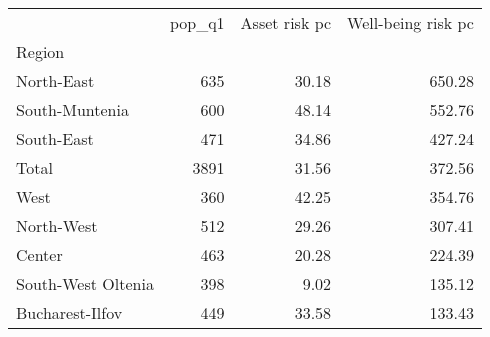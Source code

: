 \begin{tabular}{lrrr}
\toprule
{} &  pop\_q1 &  Asset risk pc &  Well-being risk pc \\
Region             &         &                &                     \\
\midrule
North-East         &     635 &          30.18 &              650.28 \\
South-Muntenia     &     600 &          48.14 &              552.76 \\
South-East         &     471 &          34.86 &              427.24 \\
Total              &    3891 &          31.56 &              372.56 \\
West               &     360 &          42.25 &              354.76 \\
North-West         &     512 &          29.26 &              307.41 \\
Center             &     463 &          20.28 &              224.39 \\
South-West Oltenia &     398 &           9.02 &              135.12 \\
Bucharest-Ilfov    &     449 &          33.58 &              133.43 \\
\bottomrule
\end{tabular}
